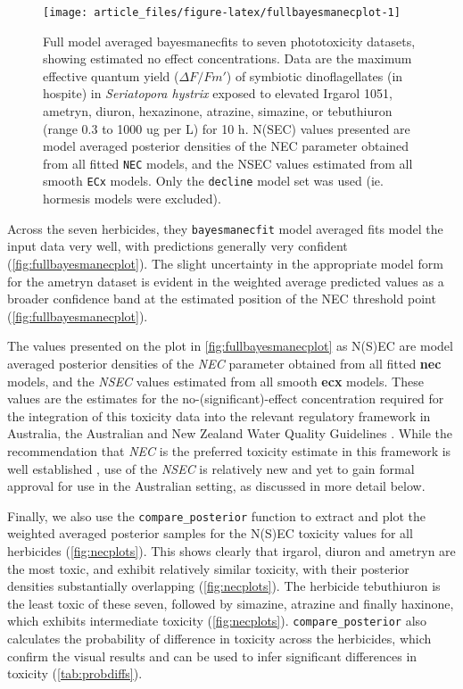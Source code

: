 \documentclass[
  shortnames]{jss}
\begin{document}
\begin{CodeChunk}
\begin{figure}[!ht]

{\centering \texttt{[image: article\_files/figure-latex/fullbayesmanecplot-1]} 

}

\caption{Full model averaged bayesmanecfits to seven phototoxicity datasets, showing estimated no effect concentrations. Data are the maximum effective quantum yield ($\Delta F / Fm'$) of symbiotic dinoflagellates (in hospite) in \textit{Seriatopora hystrix} exposed to elevated Irgarol 1051, ametryn, diuron, hexazinone, atrazine, simazine, or tebuthiuron (range 0.3 to 1000 ug per L) for 10 h. N(SEC) values presented are model averaged posterior densities of the NEC parameter obtained from all fitted \texttt{NEC} models, and the NSEC values estimated from all smooth \texttt{ECx} models. Only the \texttt{decline} model set was used (ie. hormesis models were excluded).}\label{fig:fullbayesmanecplot}
\end{figure}
\end{CodeChunk}

Across the seven herbicides, they \texttt{bayesmanecfit} model averaged fits model the input data very well, with predictions generally very confident (\autoref{fig:fullbayesmanecplot}). The slight uncertainty in the appropriate model form for the ametryn dataset is evident in the weighted average predicted values as a broader confidence band at the estimated position of the NEC threshold point (\autoref{fig:fullbayesmanecplot}).

The values presented on the plot in \autoref{fig:fullbayesmanecplot} as N(S)EC are model averaged posterior densities of the \emph{NEC} parameter obtained from all fitted \textbf{nec} models, and the \emph{NSEC} values estimated from all smooth \textbf{ecx} models. These values are the  estimates for the no-(significant)-effect concentration required for the integration of this toxicity data into the relevant regulatory framework in Australia, the Australian and New Zealand Water Quality Guidelines \citep{anzg}. While the recommendation that \emph{NEC} is the preferred toxicity estimate in this framework is well established \citep[\citet{Warne2018c}]{Warne2015}, use of the \emph{NSEC} is relatively new \citep{Fisher2022} and yet to gain formal approval for use in the Australian setting, as discussed in more detail below.

Finally, we also use the \texttt{compare\_posterior} function to extract and plot the weighted averaged posterior samples for the N(S)EC toxicity values for all herbicides (\autoref{fig:necplots}). This shows clearly that irgarol, diuron and ametryn are the most toxic, and exhibit relatively similar toxicity, with their posterior densities substantially overlapping (\autoref{fig:necplots}). The herbicide tebuthiuron is the least toxic of these seven, followed by simazine, atrazine and finally haxinone, which exhibits intermediate toxicity (\autoref{fig:necplots}). \texttt{compare\_posterior} also calculates the probability of difference in toxicity across the herbicides, which confirm the visual results and can be used to infer significant differences in toxicity (\autoref{tab:probdiffs}).
\end{document}
